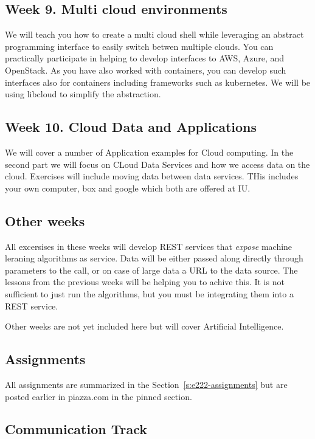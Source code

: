 \subsection{Week 9. Multi cloud environments}

We will teach you how to create a multi cloud shell while leveraging
an abstract programming interface to easily switch betwen multiple
clouds. You can practically participate in helping to develop
interfaces to AWS, Azure, and OpenStack. As you have also worked with
containers, you can develop such interfaces also for containers
including frameworks such as kubernetes. We will be using libcloud to
simplify the abstraction.
	
\subsection{Week 10. Cloud Data and Applications}

We will cover a number of Application examples for Cloud computing. In
the second part we will focus on CLoud Data Services and how we access
data on the cloud. Exercises will include moving data between data
services. THis includes your own computer, box and google which both
are offered at IU.


\subsection{Other weeks}

All excersises in these weeks will develop REST services that {\em
  expose} machine leraning algorithms as service. Data will be either
passed along directly through parameters to the call, or on case of
large data a URL to the data source. The lessons from the previous
weeks will be helping you to achive this. It is not sufficient to just
run the algorithms, but you must be integrating them into a REST service.

Other weeks are not yet included here but will cover Artificial
Intelligence.

\subsection{Assignments}

All assignments are summarized in the Section~\ref{s:e222-assignments}
but are posted earlier in piazza.com in the pinned section.


\subsection{Communication Track}

